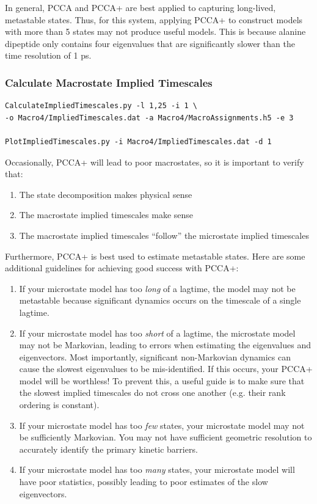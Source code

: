 \documentclass[12pt]{article}
\begin{document}
In general, PCCA and PCCA+ are best applied to capturing long-lived, metastable states.  Thus, for this system, applying PCCA+ to construct models with more than 5 states may not produce useful models.  This is because alanine dipeptide only contains four eigenvalues that are significantly slower than the time resolution of 1 ps.  

\subsubsection{Calculate Macrostate Implied Timescales}

\begin{verbatim}
CalculateImpliedTimescales.py -l 1,25 -i 1 \
-o Macro4/ImpliedTimescales.dat -a Macro4/MacroAssignments.h5 -e 3

PlotImpliedTimescales.py -i Macro4/ImpliedTimescales.dat -d 1
\end{verbatim}

Occasionally, PCCA+ will lead to poor macrostates, so it is important to verify that:

\begin{enumerate}
 \item The state decomposition makes physical sense
 \item The macrostate implied timescales make sense
 \item The macrostate implied timescales ``follow'' the microstate implied timescales
\end{enumerate}

Furthermore, PCCA+ is best used to estimate metastable states.  Here are some additional guidelines for achieving good success with PCCA+:

\begin{enumerate}
 \item If your microstate model has too \emph{long} of a lagtime, the model may not be metastable because significant dynamics occurs on the timescale of a single lagtime. 
 \item If your microstate model has too \emph{short} of a lagtime, the microstate model may not be Markovian, leading to errors when estimating the eigenvalues and eigenvectors.  Most importantly, significant non-Markovian dynamics can cause the slowest eigenvalues to be mis-identified.  If this occurs, your PCCA+ model will be worthless!  To prevent this, a useful guide is to make sure that the slowest implied timescales do not cross one another (e.g. their rank ordering is constant).  
 \item If your microstate model has too \emph{few} states, your microstate model may not be sufficiently Markovian.  You may not have sufficient geometric resolution to accurately identify the primary kinetic barriers.
 \item If your microstate model has too \emph{many} states, your microstate model will have poor statistics, possibly leading to poor estimates of the slow eigenvectors. 
\end{enumerate}
\end{document}
